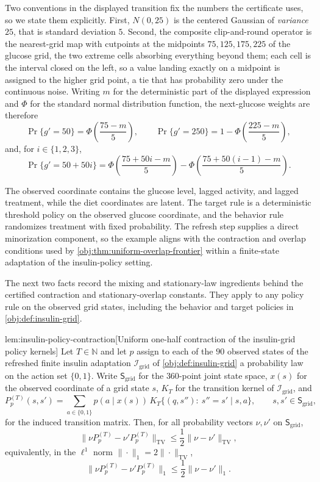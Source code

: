 \documentclass[11pt]{article}
\begin{document}
Two conventions in the displayed transition fix the numbers the certificate uses, so we state them explicitly. First, \(N(0,25)\) is the centered Gaussian of \emph{variance} \(25\), that is standard deviation \(5\). Second, the composite clip-and-round operator is the nearest-grid map with cutpoints at the midpoints \(75,125,175,225\) of the glucose grid, the two extreme cells absorbing everything beyond them; each cell is the interval closed on the left, so a value landing exactly on a midpoint is assigned to the higher grid point, a tie that has probability zero under the continuous noise. Writing \(m\) for the deterministic part of the displayed expression and \(\Phi\) for the standard normal distribution function, the next-glucose weights are therefore
\[
\Pr\{g'=50\}=\Phi\!\left(\frac{75-m}{5}\right),
\qquad
\Pr\{g'=250\}=1-\Phi\!\left(\frac{225-m}{5}\right),
\]
and, for \(i\in\{1,2,3\}\),
\[
\Pr\{g'=50+50i\}
=
\Phi\!\left(\frac{75+50i-m}{5}\right)
-
\Phi\!\left(\frac{75+50(i-1)-m}{5}\right).
\]

The observed coordinate contains the glucose level, lagged activity, and lagged treatment, while the diet coordinates are latent. The target rule is a deterministic threshold policy on the observed glucose coordinate, and the behavior rule randomizes treatment with fixed probability. The refresh step supplies a direct minorization component, so the example aligns with the contraction and overlap conditions used by \cref{obj:thm:uniform-overlap-frontier} within a finite-state adaptation of the insulin-policy setting.

The next two facts record the mixing and stationary-law ingredients behind the certified contraction and stationary-overlap constants. They apply to any policy rule on the observed grid states, including the behavior and target policies in \cref{obj:def:insulin-grid}.

\begin{lemmav}{lem:insulin-policy-contraction}[Uniform one-half contraction of the insulin-grid policy kernels]
Let \(T\in\mathbb N\) and let \(p\) assign to each of the \(90\) observed states of the refreshed finite insulin adaptation \(\mathcal I_{\mathrm{grid}}\) of \cref{obj:def:insulin-grid} a probability law on the action set \(\{0,1\}\). Write \(\mathsf S_{\mathrm{grid}}\) for the \(360\)-point joint state space, \(x(s)\) for the observed coordinate of a grid state \(s\), \(K_T\) for the transition kernel of \(\mathcal I_{\mathrm{grid}}\), and
\[
P_p^{(T)}(s,s')=\sum_{a\in\{0,1\}}p(a\mid x(s))\,K_T\{(q,s''):\ s''=s'\mid s,a\},
\qquad s,s'\in\mathsf S_{\mathrm{grid}},
\]
for the induced transition matrix. Then, for all probability vectors \(\nu,\nu'\) on \(\mathsf S_{\mathrm{grid}}\),
\[
\|\nu P_p^{(T)}-\nu'P_p^{(T)}\|_{\mathrm{TV}}
\le
\frac12\|\nu-\nu'\|_{\mathrm{TV}} ,
\]
equivalently, in the \(\ell^1\) norm \(\|\cdot\|_1=2\|\cdot\|_{\mathrm{TV}}\),
\[
\|\nu P_p^{(T)}-\nu'P_p^{(T)}\|_1\le\frac12\|\nu-\nu'\|_1 .
\]
\end{lemmav}
\end{document}
